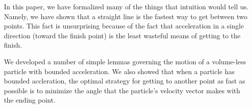 In this paper, we have formalized many of the things that intuition would tell us. Namely, we have shown that a straight line is the fastest way to get between two points. This fact is unsurprising because of the fact that acceleration in a single direction (toward the finish point) is the least wasteful means of getting to the finish.

We developed a number of simple lemmas governing the motion of a volume-less particle with bounded acceleration. We also showed that when a particle has bounded accleration, the optimal strategy for getting to another point as fast as possible is to minimize the angle that the particle's velocity vector makes with the ending point.
